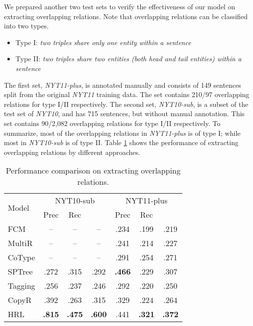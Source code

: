 \documentclass[letterpaper]{article} \usepackage{aaai19}  \usepackage{times}  \usepackage{helvet}  \usepackage{courier}  \usepackage{url}  \usepackage{graphicx}  \frenchspacing  \setlength{\pdfpagewidth}{8.5in}  \setlength{\pdfpageheight}{11in}  \usepackage{amsfonts}
\theoremstyle{definition}
\begin{document}
We prepared another two test sets to verify the effectiveness of our model on extracting overlapping relations. Note that overlapping relations can be classified into two types. 
\begin{itemize}
    \item Type I: {\it two triples share only one entity within a sentence}
    \item Type II: {\it two triples share two entities (both head and tail entities) within a sentence}
\end{itemize}
The first set,
\textit{NYT11-plus}, is annotated manually and consists of 149 sentences split from the original \textit{NYT11} training data. The set contains 210/97 overlapping relations for type I/II respectively.
The second set,
\textit{NYT10-sub}, is a subset of the test set of \textit{NYT10}, and has 715 sentences, but without manual annotation. This set contains 90/2,082 overlapping relations for type I/II respectively. To summarize, most of the overlapping relations in \textit{NYT11-plus} is of type I; while most in \textit{NYT10-sub} is of type II.
Table \ref{overlapping} shows the performance of extracting overlapping relations by different approaches. 

\begin{table}[!htb]
\centering
    \begin{tabular}{lcccccc}
    \toprule
        \multirow{2}{*}{Model} & \multicolumn{3}{c}{NYT10-sub} & \multicolumn{3}{c}{NYT11-plus}  \\
        & Prec & Rec &  & Prec & Rec &  \\
    \midrule
        FCM    & -- & -- & -- & .234 & .199 & .219 \\
        MultiR & -- & -- & -- & .241 & .214 & .227 \\
        CoType & -- & -- & -- & .291 & .254 & .271 \\
        SPTree & .272 & .315 & .292 & \textbf{.466} & .229 & .307 \\
        Tagging & .256 & .237 & .246 & .292 & .220 & .250 \\
        CopyR & .392 & .263 & .315 & .329 & .224 & .264 \\
    \midrule
        HRL    & \textbf{.815} & \textbf{.475} & \textbf{.600} & .441 & \textbf{.321} & \textbf{.372} \\
    \bottomrule
    \end{tabular}
    \caption{Performance comparison on extracting overlapping relations.}
    \label{overlapping}
\end{table} 
\end{document}
